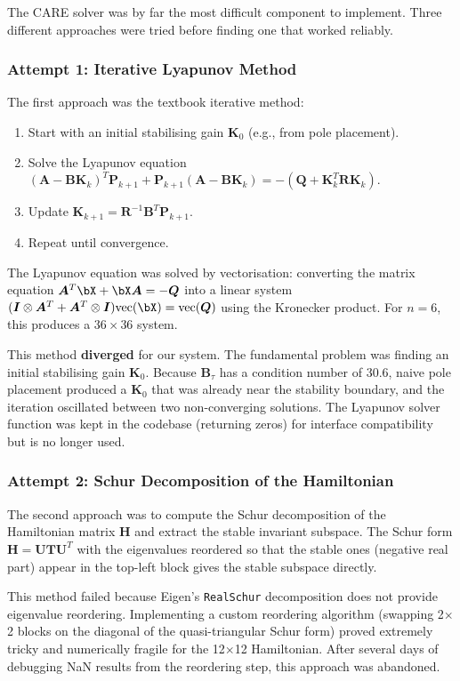 \documentclass[12pt, a4paper]{article}
\newcommand{\bK}{\bm{K}}
\newcommand{\bA}{\bm{A}}
\newcommand{\bB}{\bm{B}}
\newcommand{\bP}{\bm{P}}
\newcommand{\bQ}{\bm{Q}}
\newcommand{\bR}{\bm{R}}
\newcommand{\bI}{\bm{I}}
\begin{document}
The CARE solver was by far the most difficult component to implement.  Three different approaches were tried before finding one that worked reliably.

\subsubsection{Attempt 1: Iterative Lyapunov Method}

The first approach was the textbook iterative method:
\begin{enumerate}
    \item Start with an initial stabilising gain $\bK_0$ (e.g., from pole placement).
    \item Solve the Lyapunov equation $(\bA - \bB\bK_k)^T \bP_{k+1} + \bP_{k+1}(\bA - \bB\bK_k) = -(\bQ + \bK_k^T \bR \bK_k)$.
    \item Update $\bK_{k+1} = \bR^{-1} \bB^T \bP_{k+1}$.
    \item Repeat until convergence.
\end{enumerate}

The Lyapunov equation was solved by vectorisation: converting the matrix equation $\bA^T \bX + \bX \bA = -\bQ$ into a linear system $(\bI \otimes \bA^T + \bA^T \otimes \bI) \text{vec}(\bX) = \text{vec}(\bQ)$ using the Kronecker product.  For $n = 6$, this produces a $36 \times 36$ system.

This method \textbf{diverged} for our system.  The fundamental problem was finding an initial stabilising gain $\bK_0$.  Because $\bB_\tau$ has a condition number of 30.6, naive pole placement produced a $\bK_0$ that was already near the stability boundary, and the iteration oscillated between two non-converging solutions.  The Lyapunov solver function was kept in the codebase (returning zeros) for interface compatibility but is no longer used.

\subsubsection{Attempt 2: Schur Decomposition of the Hamiltonian}

The second approach was to compute the Schur decomposition of the Hamiltonian matrix $\bm{H}$ and extract the stable invariant subspace.  The Schur form $\bm{H} = \bm{U} \bm{T} \bm{U}^T$ with the eigenvalues reordered so that the stable ones (negative real part) appear in the top-left block gives the stable subspace directly.

This method failed because Eigen's \texttt{RealSchur} decomposition does not provide eigenvalue reordering.  Implementing a custom reordering algorithm (swapping 2$\times$2 blocks on the diagonal of the quasi-triangular Schur form) proved extremely tricky and numerically fragile for the 12$\times$12 Hamiltonian.  After several days of debugging NaN results from the reordering step, this approach was abandoned.
\end{document}
